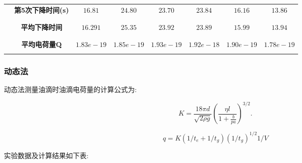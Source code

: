 \documentclass[c5size,amstex,a4paper,twoside]{ctexart}
\begin{document}
\begin{longtable}{| c | c | c | c
| c | c | c | c |}
   &   \textbf{第5次下降时间(s)}   &   $16.81$      &   $24.80$      &   $23.70$      &   $23.84$   &   $16.16$    &   $13.86$ \\
    & & & & & & &\\
    \cline{2-8}
    & & & & & & &\\
   &   \textbf{平均下降时间}   &   $16.291$      &   $25.35$      &   $23.92$      &   $23.89$   &   $15.99$    &   $13.94$ \\
    & & & & & & &\\
     \cline{2-8}
    & & & & & & &\\
    &   \textbf{平均电荷量Q}   &   $1.83e-19$      &   $1.85e-19$      &   $1.93e-19$      &   $1.92e-18$    &   $1.90e-19$    &   $1.78e-19$\\
    & & & & & & &\\
    \hline
    \end{longtable}


\subsubsection{动态法}

动态法测量油滴时油滴电荷量的计算公式为:

\[K = \frac{18\pi d}{\sqrt{2\rho g}} {{\left( \frac{\eta l}{{1 + \frac{b}{pa}}} \right)}}^{3/2}.\]

\[q=K(1/t_e+1/t_g)(1/t_g)^{1/2} 1/V\]


实验数据及计算结果如下表:
\end{document}
